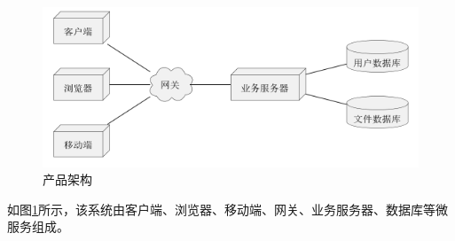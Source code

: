 \begin{figure}[H]
    \begin{center}
        \includegraphics[scale=0.5]{examples/产品架构图.png}
        \caption{产品架构}
        \label{fig:productarch}
    \end{center}
\end{figure}

如图\ref{fig:productarch}所示，该系统由客户端、浏览器、移动端、网关、业务服务器、数据库等微服务组成。